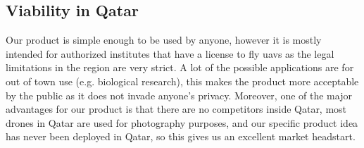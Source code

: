 \documentclass[../main.tex]{subfiles}
\begin{document}
\subsection{Viability in Qatar}
	Our product is simple enough to be used by anyone, however it is mostly intended for 
	authorized institutes that have a license to fly \glspl{uav} as the legal limitations 
	in the region are very strict. 
	A lot of the possible applications are for out of town use (e.g. biological research), 
	this makes the product more acceptable by the public as it does not invade anyone's privacy.
	Moreover, one of the major advantages for our product is that there are no competitors 
	inside Qatar, most drones in Qatar are used for photography purposes, and our
	specific product idea has never been deployed in Qatar, so this gives us an excellent 
	market headstart. 
\end{document}
